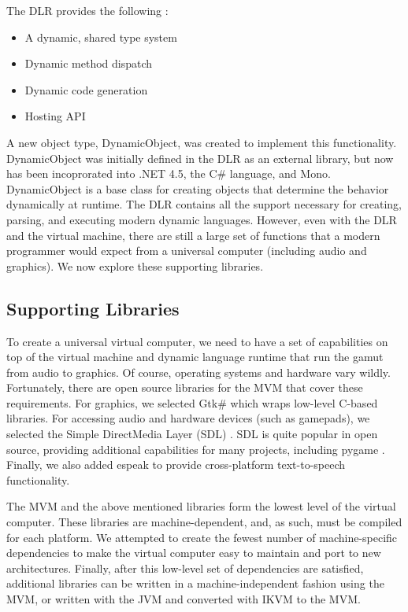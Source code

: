 \documentclass[preprint]{sigplanconf}
\begin{document}
The DLR provides the following \cite{dlr-wikipedia}:
\begin{itemize}
\item A dynamic, shared type system 
\item Dynamic method dispatch
\item Dynamic code generation
\item Hosting API
\end{itemize}

A new object type, DynamicObject, was created to implement this
functionality. DynamicObject was initially defined in the DLR as an
external library, but now has been incoprorated into .NET 4.5, the C\#
language, and Mono. DynamicObject is a base class for creating objects
that determine the behavior dynamically at runtime. The DLR contains
all the support necessary for creating, parsing, and executing modern
dynamic languages. However, even with the DLR and the virtual machine,
there are still a large set of functions that a modern programmer
would expect from a universal computer (including audio and
graphics). We now explore these supporting libraries.


\subsection{Supporting Libraries}

To create a universal virtual computer, we need to have a set of
capabilities on top of the virtual machine and dynamic language
runtime that run the gamut from audio to graphics. Of course,
operating systems and hardware vary wildly. Fortunately, there are
open source libraries for the MVM that cover these requirements. For
graphics, we selected Gtk\# \cite{gtk-sharp} which wraps low-level
C-based libraries. For accessing audio and hardware devices (such as
gamepads), we selected the Simple DirectMedia Layer (SDL)
\cite{sdl}. SDL is quite popular in open source, providing additional
capabilities for many projects, including pygame
\cite{pygame}. Finally, we also added espeak \cite{espeak} to provide
cross-platform text-to-speech functionality.


The MVM and the above mentioned libraries form the lowest level of the
virtual computer. These libraries are machine-dependent, and, as such,
must be compiled for each platform. We attempted to create the fewest
number of machine-specific dependencies to make the virtual computer
easy to maintain and port to new architectures.  Finally, after this
low-level set of dependencies are satisfied, additional libraries can
be written in a machine-independent fashion using the MVM, or written
with the JVM and converted with IKVM to the MVM.
\end{document}
